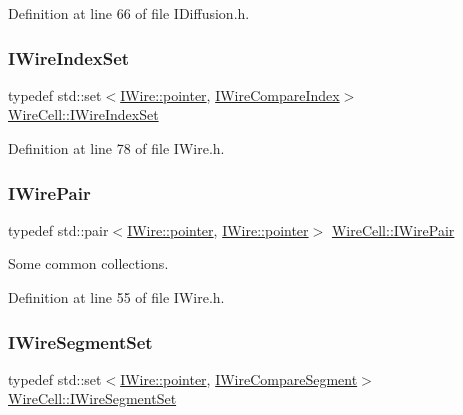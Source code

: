 Definition at line 66 of file I\+Diffusion.\+h.

\mbox{\label{namespace_wire_cell_a59529e31ab6cb85f53642db06acdadac}} 
\subsubsection{\texorpdfstring{I\+Wire\+Index\+Set}{IWireIndexSet}}
{\footnotesize\ttfamily typedef std\+::set$<$\hyperlink{class_wire_cell_1_1_i_data_aff870b3ae8333cf9265941eef62498bc}{I\+Wire\+::pointer}, \hyperlink{struct_wire_cell_1_1_i_wire_compare_index}{I\+Wire\+Compare\+Index}$>$ \hyperlink{namespace_wire_cell_a59529e31ab6cb85f53642db06acdadac}{Wire\+Cell\+::\+I\+Wire\+Index\+Set}}



Definition at line 78 of file I\+Wire.\+h.

\mbox{\label{namespace_wire_cell_ad5f0e75d8f0e885d9ae4e9154e812d76}} 
\subsubsection{\texorpdfstring{I\+Wire\+Pair}{IWirePair}}
{\footnotesize\ttfamily typedef std\+::pair$<$\hyperlink{class_wire_cell_1_1_i_data_aff870b3ae8333cf9265941eef62498bc}{I\+Wire\+::pointer}, \hyperlink{class_wire_cell_1_1_i_data_aff870b3ae8333cf9265941eef62498bc}{I\+Wire\+::pointer}$>$ \hyperlink{namespace_wire_cell_ad5f0e75d8f0e885d9ae4e9154e812d76}{Wire\+Cell\+::\+I\+Wire\+Pair}}



Some common collections. 



Definition at line 55 of file I\+Wire.\+h.

\mbox{\label{namespace_wire_cell_aff640c8ffcb5478403ad4bcede30c54b}} 
\subsubsection{\texorpdfstring{I\+Wire\+Segment\+Set}{IWireSegmentSet}}
{\footnotesize\ttfamily typedef std\+::set$<$\hyperlink{class_wire_cell_1_1_i_data_aff870b3ae8333cf9265941eef62498bc}{I\+Wire\+::pointer}, \hyperlink{struct_wire_cell_1_1_i_wire_compare_segment}{I\+Wire\+Compare\+Segment}$>$ \hyperlink{namespace_wire_cell_aff640c8ffcb5478403ad4bcede30c54b}{Wire\+Cell\+::\+I\+Wire\+Segment\+Set}}



